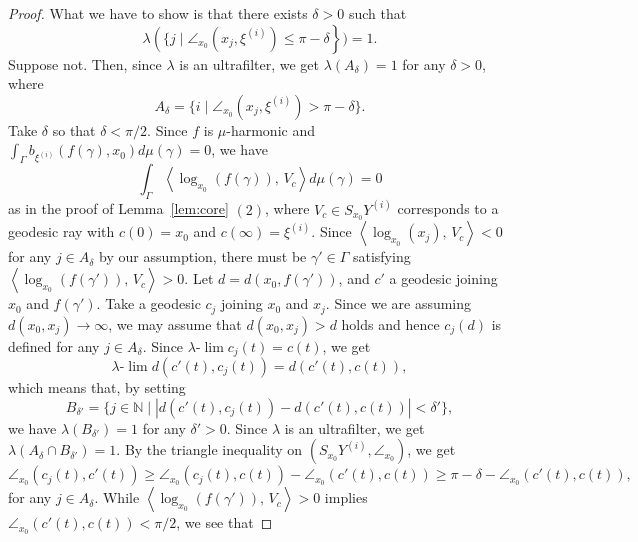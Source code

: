 \documentclass[12pt]{amsart}
\numberwithin{equation}{section}
\theoremstyle{plain}
\theoremstyle{definition}
\theoremstyle{remark}
\newcommand{\N}{{\mathbb N}}
\newcommand{\tcprj}{\log}
\newcommand{\inner}[2]{\left\langle #1,\, #2 \right\rangle}
\newcommand{\ulim}{\lambda{\text{-}}\!\lim}
\newcommand{\xxi}[1]{\xi^{(#1)}}
\begin{document}
\begin{proof}
 What we have to show is that there exists $\delta > 0$ such that
\begin{equation*}
  \lambda\left(\{j \mid
 \angle_{x_0}(x_j,\xxi{i})\leq \pi-\delta \right\})=1. 
\end{equation*}
 Suppose not.  Then, since $\lambda$ is an ultrafilter, we get
 $\lambda (A_{\delta})=1$ for any $\delta>0$, where
 \begin{equation*}
 A_{\delta} = 
 \{i \mid \angle_{x_0}(x_j,\xxi{i})>\pi -\delta \}. 
 \end{equation*}
 Take $\delta$ so that $\delta < \pi/2$. 
 Since $f$ is $\mu$-harmonic and 
 $\int_{\Gamma}b_{\xxi{i}}(f(\gamma),x_0) d\mu(\gamma)=0$,  we have 
 \begin{equation*}
 \int_{\Gamma} \inner{\tcprj_{x_0}(f(\gamma))}{V_c} 
 d\mu (\gamma)=0
 \end{equation*}
 as in the proof of Lemma~\ref{lem:core} $(2)$, where 
 $V_c \in S_{x_0}Y^{(i)}$ corresponds to a geodesic ray with
 $c(0)=x_0$ and $c(\infty)=\xxi{i}$. 
 Since $\inner{\tcprj_{x_0} (x_j)}{V_c} < 0$ for  any 
 $j \in A_{\delta}$ by our assumption, 
 there must be $\gamma' \in \Gamma$ satisfying
 $\inner{\tcprj_{x_0} (f(\gamma'))}{V_c} > 0$.  
 Let  $d=d(x_0,f(\gamma'))$, and $c'$ a geodesic joining $x_0$ and
 $f(\gamma')$. 
 Take a geodesic $c_j$ joining $x_0$ and $x_j$.  
 Since we are assuming $d(x_0,x_j) \to \infty$, 
 we may assume that $d(x_0,x_j)> d$
 holds and hence $c_j(d)$ is defined for any $j \in A_{\delta}$. 
 Since $\ulim c_j(t) = c(t)$, we get
 \begin{equation*}
 \ulim d(c'(t),c_j(t)) = d(c'(t),c(t)), 
 \end{equation*}
 which means that, by setting 
 \begin{equation*}
 B_{\delta'}= \{j \in \N \mid  
 |d(c'(t),c_j(t))-d(c'(t),c(t))| < \delta'\}, 
 \end{equation*}
 we have $\lambda (B_{\delta'})=1$ for any $\delta'>0$.  
 Since $\lambda$ is an ultrafilter, we get 
 $\lambda (A_{\delta}\cap B_{\delta'})=1$. 
 By the triangle inequality on $(S_{x_0}Y^{(i)}, \angle_{x_0})$, 
 we get
 \begin{equation*}
 \angle_{x_0}(c_j(t), c'(t)) \geq 
 \angle_{x_0}(c_j(t), c(t)) - \angle_{x_0}(c'(t),c(t))
 \geq \pi -\delta - \angle_{x_0}(c'(t),c(t)), 
 \end{equation*}
 for any $j \in A_{\delta}$. 
 While $\inner{\tcprj_{x_0}(f(\gamma'))}{V_c} >0$ implies
 $\angle_{x_0}(c'(t), c(t))< \pi/2$, we see that 

\end{proof}
\end{document}
